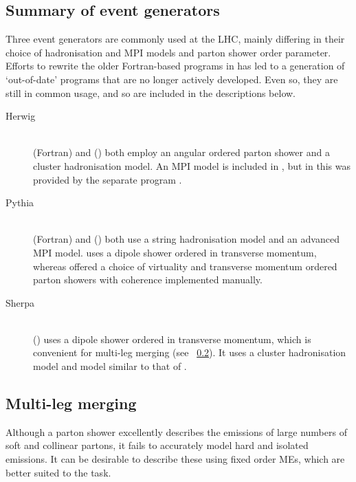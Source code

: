 \subsection{Summary of event generators}
\label{sec:mc:generators}

Three event generators are commonly used at the \acs{LHC}, mainly differing in their 
choice of hadronisation and \ac{MPI} models and parton shower order parameter. Efforts to 
rewrite the older Fortran-based programs in \cpp has led to a generation of `out-of-date' 
programs that are no longer actively developed. Even so, they are still in common usage, 
and so are included in the descriptions below.

\begin{description}
\item[Herwig] \hfill \\
	\fherwig (Fortran) \cite{fHerwig} and \herwigpp (\cpp) \cite{Herwig++} both employ an 
	angular ordered parton shower and a cluster hadronisation model. An \ac{MPI} model is 
	included in \herwigpp, but in \fherwig this was provided by the separate program 
	\jimmy.
\item[Pythia] \hfill \\
	 (Fortran) \cite{Pythia6} and  (\cpp) \cite{Pythia8} both use a 
	string hadronisation model and an advanced \ac{MPI} model.  uses a dipole 
	shower ordered in transverse momentum, whereas  offered a choice of 
	virtuality and transverse momentum ordered parton showers with coherence implemented 
	manually.
\item[Sherpa] \hfill \\
	\sherpa (\cpp) \cite{Sherpa} uses a dipole shower ordered in transverse momentum, 
	which is convenient for multi-leg merging (see \Section~\ref{sec:mc:merging}). It 
	uses a cluster hadronisation model and  model similar to that of .
\end{description}



\subsection{Multi-leg merging}
\label{sec:mc:merging}

Although a parton shower excellently describes the emissions of large numbers of soft and 
collinear partons, it fails to accurately model hard and isolated emissions. It can be 
desirable to describe these using fixed order \acp{ME}, which are better suited to the 
task.

